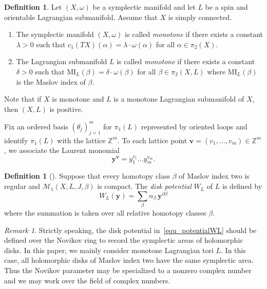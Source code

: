 \documentclass[11pt]{amsart}
\theoremstyle{plain}
\theoremstyle{definition}
\newtheorem{definition}[theorem]{Definition}
\theoremstyle{remark}
\newtheorem{remark}[theorem]{Remark}
\newcommand{\Z}{\mathbb{Z}}
\numberwithin{equation}{section} \numberwithin{table}{section}
\numberwithin{equation}{section}
\begin{document}
\begin{definition} 
Let $(X, \omega)$ be a symplectic manifold and let $L$ be a spin and orientable Lagrangian submanifold. Assume that $X$ is simply connected.
\begin{enumerate}
\item The symplectic manifold $(X, \omega)$ is called \emph{monotone} if there exists a constant $\lambda > 0$ such that $c_1(TX)(\alpha) =  \lambda \cdot \omega(\alpha)$ for all $\alpha \in \pi_2(X)$. 
\item The Lagrangian submanifold $L$ is called \emph{monotone} if there exists a constant $\delta > 0$ such that $\mathrm{MI}_L (\beta) = \delta \cdot \omega (\beta) $ for all $\beta \in \pi_2 (X, L)$ where $\mathrm{MI}_L(\beta)$ is the Maslov index of $\beta$.
\end{enumerate}
Note that if $X$ is monotone and $L$ is a monotone Lagrangian submanifold of $X$, then $(X,L)$ is positive.
\end{definition}

Fix an ordered basis $(\theta_j)_{j=1}^m$ for $\pi_1(L)$ represented by oriented loops and identify $\pi_1(L)$ with the lattice $\Z^m$. To each lattice point $\mathbf{v} = (v_1, \dots, v_m) \in \Z^m$, we associate the Laurent monomial 
$$
\mathbf{y}^\mathbf{v} = y_1^{v_1} \dots y_m^{v_m}. 
$$

\begin{definition}[\cite{CO06, Aur07, FOOO10}]
Suppose that every homotopy class $\beta$ of Maslov index two is regular and $\mathcal{M}_1(X, L, J, \beta)$ is compact. 
The \emph{disk potential} $W_L$ of $L$ is defined by
\begin{equation}\label{equ_potentialWL}
W_L(\mathbf{y}) = \sum_\beta n_{\beta} \, \mathbf{y}^{\partial \beta}
\end{equation}
where the summation is taken over all relative homotopy classes $\beta$.
\end{definition}

\begin{remark}
Strictly speaking, the disk potential in~\eqref{equ_potentialWL} should be defined over the Novikov ring to record the symplectic areas of holomorphic disks. In this paper, we mainly consider  monotone Lagrangian tori $L$. In this case, all holomorphic disks of Maslov index two have the same symplectic area. Thus the Novikov parameter may be specialized to a nonzero complex number and we may work over the field of complex numbers.
\end{remark}
\end{document}
